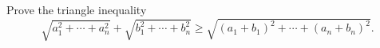 Prove the triangle inequality
\[ \sqrt{a_1^2 + \cdots + a_n^2} + \sqrt{b_1^2 + \cdots + b_n^2} \geq \sqrt{(a_1 + b_1)^2 + \cdots + (a_n + b_n)^2}. \]
